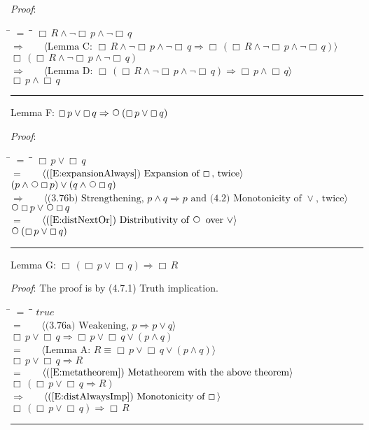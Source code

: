 \documentclass[12pt, fleqn, leqno]{article}
\newcommand{\lgap}{2pt}                             %
\newcommand{\mymathindent}{24pt}                    %
\newcommand{\impl}{\ensuremath{\Rightarrow}}        %
\newcommand{\Next}{\;\,\text{\raisebox{3.5pt}{\circle{6}}}}
\newcommand{\Always}{\Box\,}
\newcommand{\myqed}{\rule[-.23ex]{1.2ex}{2.0ex}}
\newcommand{\myqedtab}{\hspace{384pt}}              %
\newcommand{\Gll} {\langle}                         %
\newcommand{\Ggg} {\rangle}                         %
\newcommand{\Hint}[1]     {\ \ \ $\Gll              \mbox{#1} \Ggg$ }   %
\begin{document}
\emph{Proof}:
\begin{tabbing}
\hspace{\mymathindent} \= $= \;$ \= \myqedtab \= \kill
  \> \>   $\Always R \land \neg \Always p \land \neg \Always q$\\[\lgap]
  \> $\impl$  \>  \Hint{Lemma C: $\Always R \land \neg \Always p \land \neg \Always q \impl \Always (\Always R \land \neg \Always p \land \neg \Always q)$}\\[\lgap]
  \> \>   $\Always (\Always R \land \neg \Always p \land \neg \Always q)$\\[\lgap]
  \> $\impl$  \>  \Hint{Lemma D: $\Always (\Always R \land \neg \Always p \land \neg \Always q) \impl \Always p \land \Always q$}\\[\lgap]
  \> \>   $\Always p \land \Always q$ \quad \myqed
\end{tabbing}
Lemma F: $\Always p \lor \Always q \impl \Next (\Always p \lor \Always q)$

\emph{Proof}:
\begin{tabbing}
\hspace{\mymathindent} \= $= \;$ \= \myqedtab \= \kill
  \> \>   $\Always p \lor \Always q$\\[\lgap]
  \> $=$  \>  \Hint{(\ref{E:expansionAlways}) Expansion of $\Always$, twice}\\[\lgap]
  \> \>   $(p \land \Next \Always p) \lor (q \land \Next \Always q)$\\[\lgap]
  \> $\impl$ \> \Hint{(3.76b) Strengthening, $p \land q \impl p$ and (4.2) Monotonicity of $\lor$, twice}\\[\lgap]
  \> \>   $\Next \Always p \lor \Next \Always q$\\[\lgap]
  \> $=$  \>  \Hint{(\ref{E:distNextOr}) Distributivity of $\Next$ over $\lor$}\\[\lgap]
  \> \>   $\Next (\Always p \lor \Always q)$ \quad \myqed
\end{tabbing}
Lemma G: $\Always (\Always p \lor \Always q) \impl \Always R$

\emph{Proof}: The proof is by (4.7.1) Truth implication.
\begin{tabbing}
\hspace{\mymathindent} \= $= \;$ \= \myqedtab \= \kill
  \> \>   $true$\\[\lgap]
  \> $=$ \> \Hint{(3.76a) Weakening, $p\impl p\lor q$}\\[\lgap]
  \> \> $\Always p \lor \Always q \impl \Always p \lor \Always q \lor (p \land q)$\\[\lgap]
  \> $=$ \> \Hint{Lemma A: $R \equiv \Always p \lor \Always q \lor (p \land q)$}\\[\lgap]
  \> \> $\Always p \lor \Always q \impl R$\\[\lgap]
  \> $=$ \> \Hint{(\ref{E:metatheorem}) Metatheorem with the above theorem}\\[\lgap]
  \> \>   $\Always (\Always p \lor \Always q \impl R)$\\[\lgap]
  \> $\impl$  \>  \Hint{(\ref{E:distAlwaysImp}) Monotonicity of $\Always$}\\[\lgap]
  \> \>   $\Always (\Always p \lor \Always q) \impl \Always R$ \quad \myqed
\end{tabbing}
\end{document}
